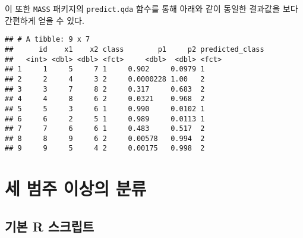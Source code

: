 \documentclass[
]{book}
\newenvironment{Shaded}{\begin{snugshade}}{\end{snugshade}}
\newcommand{\AttributeTok}[1]{\textcolor[rgb]{0.77,0.63,0.00}{#1}}
\newcommand{\FunctionTok}[1]{\textcolor[rgb]{0.00,0.00,0.00}{#1}}
\newcommand{\NormalTok}[1]{#1}
\newcommand{\SpecialCharTok}[1]{\textcolor[rgb]{0.00,0.00,0.00}{#1}}
\newcommand{\StringTok}[1]{\textcolor[rgb]{0.31,0.60,0.02}{#1}}
\begin{document}
이 또한 \texttt{MASS} 패키지의 \texttt{predict.qda} 함수를 통해 아래와 같이 동일한 결과값을 보다 간편하게 얻을 수 있다.

\begin{Shaded}
\end{Shaded}

\begin{verbatim}
## # A tibble: 9 x 7
##      id    x1    x2 class        p1     p2 predicted_class
##   <int> <dbl> <dbl> <fct>     <dbl>  <dbl> <fct>          
## 1     1     5     7 1     0.902     0.0979 1              
## 2     2     4     3 2     0.0000228 1.00   2              
## 3     3     7     8 2     0.317     0.683  2              
## 4     4     8     6 2     0.0321    0.968  2              
## 5     5     3     6 1     0.990     0.0102 1              
## 6     6     2     5 1     0.989     0.0113 1              
## 7     7     6     6 1     0.483     0.517  2              
## 8     8     9     6 2     0.00578   0.994  2              
## 9     9     5     4 2     0.00175   0.998  2
\end{verbatim}

\hypertarget{da-multiclass}{%
\section{세 범주 이상의 분류}\label{da-multiclass}}

\hypertarget{mutliclass-da-basic-script}{%
\subsection{기본 R 스크립트}\label{mutliclass-da-basic-script}}
\end{document}
